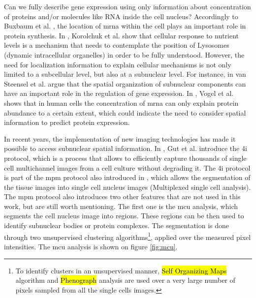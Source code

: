 
\graphicspath{{./Sections/Introduction/Resources/}}

\glsresetall

Can we fully describe gene expression using only information about concentration of proteins and/or molecules like RNA inside the cell nucleus? Accordingly to Buxbaum et al. \cite{Buxbaum_2014}, the location of \gls{mrna} within the cell plays an important role in protein synthesis. In \cite{Korolchuk2011}, Korolchuk et al. show that cellular response to nutrient levels is a mechanism that needs to contemplate the position of Lysosomes (dynamic intracellular organelles) in order to be fully understood. However, the need for localization information to explain cellular mechanisms is not only limited to a subcellular level, but also at a subnuclear level. For instance, in \cite{van2019role} van Steensel et al. argue that the spatial organization of subnuclear components can have an important role in the regulation of gene expression. In \cite{vogel2010sequence}, Vogel et al. shows that in human cells the concentration of \gls{mrna} can only explain protein abundance to a certain extent, which could indicate the need to consider spatial information to predict protein expression.

In recent years, the implementation of new imaging technologies has made it possible to access subnuclear spatial information. In \cite{Guteaar7042}, Gut et al. introduce the \gls{4i} protocol, which is a process that allows to efficiently capture thousands of single cell multichannel images from a cell culture without degrading it. The \gls{4i} protocol is part of the \gls{mpm} protocol also introduced in \cite{Guteaar7042}, which allows the segmentation of the tissue images into single cell nucleus images (Multiplexed single cell analysis).
The \gls{mpm} protocol also introduces two other features that are not used in this work, but are still worth mentioning.
The first one is the \gls{mcu} analysis, which segments the cell nucleus image into regions.
These regions can be then used to identify subnuclear bodies or protein complexes. The segmentation is done through two unsupervised clustering algorithms\footnote{To identify clusters in an unsupervised manner, \hl{Self Organizing Maps} algorithm and \hl{Phenograph} analysis are used over a very large number of pixels sampled from all the single cells images.}, applied over the measured pixel intensities. The \gls{mcu} analysis is shown on figure \ref{fig:mcu}.

